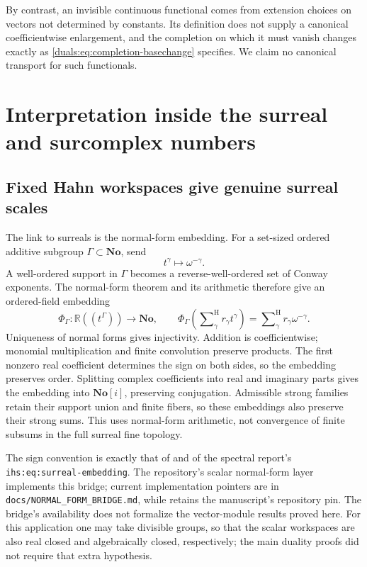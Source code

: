 \documentclass[11pt,letterpaper]{article}
\numberwithin{equation}{section}
\theoremstyle{definition}
\theoremstyle{remark}
\newcommand{\R}{\mathbb R}
\newcommand{\No}{\mathbf{No}}
\newcommand{\sH}{\mathop{\sum}\nolimits^{\mathrm H}}
\newcommand{\ihs}[1]{\texttt{ihs:#1}}
\begin{document}
By contrast, an invisible continuous functional comes from extension
choices on vectors not determined by constants. Its definition does
not supply a canonical coefficientwise enlargement, and the completion
on which it must vanish changes exactly as
\eqref{duals:eq:completion-basechange} specifies. We claim no canonical
transport for such functionals.

\section{Interpretation inside the surreal and surcomplex numbers}
\label{duals:sec:surreal}

\subsection{Fixed Hahn workspaces give genuine surreal scales}
The link to surreals is the normal-form embedding. For a set-sized
ordered additive subgroup $\Gamma\subset\No$, send
\begin{equation}\label{duals:eq:surreal-embedding}
 t^\gamma\longmapsto\omega^{-\gamma}.
\end{equation}
A well-ordered support in $\Gamma$ becomes a reverse-well-ordered
set of Conway exponents. The normal-form theorem and its arithmetic
therefore give an ordered-field embedding
\[
 \Phi_\Gamma:\R((t^\Gamma))\longrightarrow\No,
 \qquad
 \Phi_\Gamma\!\left(\sH_\gamma r_\gamma t^\gamma\right)
 =\sH_\gamma r_\gamma\omega^{-\gamma}.
\]
Uniqueness of normal forms gives injectivity. Addition is coefficientwise;
monomial multiplication and finite convolution preserve products.
The first nonzero real coefficient determines the sign on both sides,
so the embedding preserves order. Splitting complex coefficients into
real and imaginary parts gives the embedding into $\No[i]$, preserving
conjugation. Admissible strong families retain their support union and
finite fibers, so these embeddings also preserve their strong sums.
This uses normal-form arithmetic, not convergence of finite subsums in
the full surreal fine topology.

The sign convention is exactly that of \cite[Sections~2.2 and~2.4]{KKS}
and of the spectral report's \ihs{eq:surreal-embedding}. The repository's
scalar normal-form layer implements this bridge; current implementation
pointers are in \texttt{docs/NORMAL\_FORM\_BRIDGE.md}, while
\cite{RepoRoot} retains the manuscript's repository pin. The bridge's
availability does not formalize the vector-module results proved here. For this application one may take divisible groups,
so that the scalar workspaces are also real closed and algebraically
closed, respectively; the main duality proofs did not require that
extra hypothesis.
\end{document}
